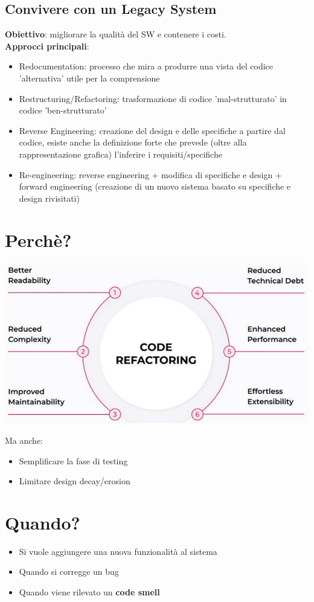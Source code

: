 \documentclass[12pt, a4paper]{report}
\begin{document}
\subsection{Convivere con un Legacy System}
\textbf{Obiettivo}: migliorare la qualità del SW e contenere i costi.\\
\textbf{Approcci principali}:
\begin{itemize}
    \item Redocumentation: processo che mira a produrre una vista del codice 'alternativa' utile per la comprensione
    \item Restructuring/Refactoring: trasformazione di codice 'mal-strutturato' in codice 'ben-strutturato'
    \item Reverse Engineering: creazione del design e delle specifiche a partire dal codice, esiste anche la definizione forte che prevede (oltre alla rappresentazione grafica) l'inferire i requisiti/specifiche
    \item Re-engineering: reverse engineering + modifica di specifiche e design + forward engineering (creazione di un nuovo sistema basato su specifiche e design rivisitati)
\end{itemize}
\section{Perchè?}
\begin{center}
    \includegraphics[width=.7\textwidth]{Immagini/reasonwhyrefactoring.png}
\end{center}
Ma anche:
\begin{itemize}
    \item Semplificare la fase di testing
    \item Limitare design decay/erosion
\end{itemize}
\section{Quando?}
\begin{itemize}
    \item Si vuole aggiungere una nuova funzionalità al sistema
    \item Quando si corregge un bug
    \item Quando viene rilevato un \textbf{code smell}
\end{itemize}
\end{document}
